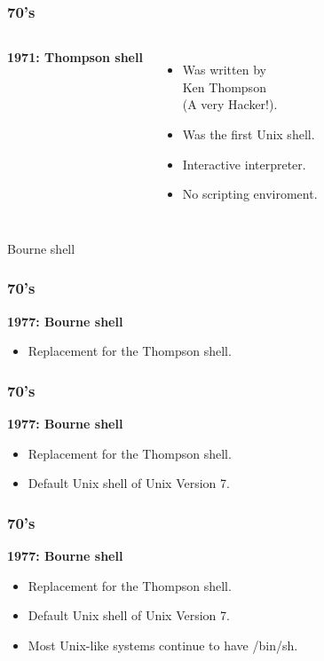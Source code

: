 \documentclass[aspectratio=169]{beamer}
\begin{document}
\begin{frame}
	\frametitle{ 70's}
	\begin{columns}[c]
			\textbf{1971: Thompson shell}
			\begin{itemize}
				\item Was written by\\
					Ken Thompson\\
					(A very Hacker!).
				\item Was the first Unix shell.
				\item Interactive interpreter.
				\item No scripting enviroment.
			\end{itemize}
			\begin{figure}[h!]
			\end{figure}		
	\end{columns}
\end{frame}


\begin{frame}
    \Huge{\centerline{Bourne shell}}
\end{frame}

\begin{frame}
	\frametitle{ 70's}
	\textbf{1977: Bourne shell}
	\begin{itemize}
		\item Replacement for the Thompson shell.
	\end{itemize}
\end{frame}

\begin{frame}
	\frametitle{ 70's}
	\textbf{1977: Bourne shell}
	\begin{itemize}
		\item Replacement for the Thompson shell.
		\item Default Unix shell of Unix Version 7.
	\end{itemize}
\end{frame}

\begin{frame}
	\frametitle{ 70's}
	\textbf{1977: Bourne shell}
	\begin{itemize}
		\item Replacement for the Thompson shell.
		\item Default Unix shell of Unix Version 7. 
		\item Most Unix-like systems continue to have /bin/sh.
	\end{itemize}
\end{frame}
\end{document}
